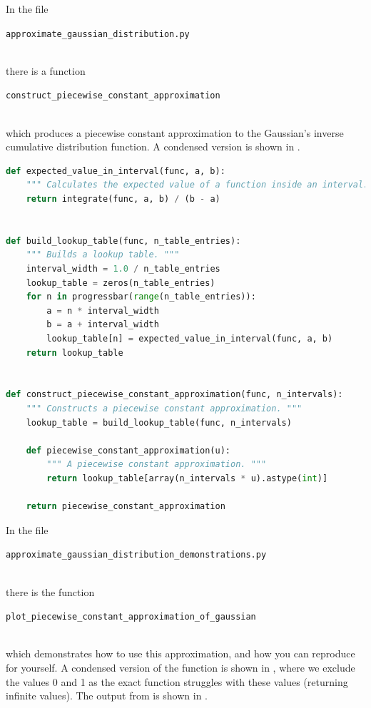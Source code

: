 \documentclass[11pt,a4paper,twoside,english]{extarticle}
\newcommand{\singlecodeline}[1]{\\[1em]\centerline{\lstinline[basicstyle=\ttfamily]$#1$}\\[1em]}
\begin{document}
In the file \singlecodeline{approximate_gaussian_distribution.py} there is a function \singlecodeline{construct_piecewise_constant_approximation} which produces a piecewise constant approximation to the Gaussian's inverse cumulative distribution function. A condensed version is shown in .

\begin{lstfloat}[htb]
\begin{lstlisting}[language=python, captionpos=b, caption={Constructing a piecewise constant approximation.}, label={code:python:construct_piecewise_constant_approximation}]
def expected_value_in_interval(func, a, b):
    """ Calculates the expected value of a function inside an interval. """
    return integrate(func, a, b) / (b - a)


def build_lookup_table(func, n_table_entries):
    """ Builds a lookup table. """
    interval_width = 1.0 / n_table_entries
    lookup_table = zeros(n_table_entries)
    for n in progressbar(range(n_table_entries)):
        a = n * interval_width
        b = a + interval_width
        lookup_table[n] = expected_value_in_interval(func, a, b)
    return lookup_table


def construct_piecewise_constant_approximation(func, n_intervals):
    """ Constructs a piecewise constant approximation. """
    lookup_table = build_lookup_table(func, n_intervals)

    def piecewise_constant_approximation(u):
        """ A piecewise constant approximation. """
        return lookup_table[array(n_intervals * u).astype(int)]

    return piecewise_constant_approximation
\end{lstlisting}
\end{lstfloat}

In the file \singlecodeline{approximate_gaussian_distribution_demonstrations.py}
there is the function  
\singlecodeline{plot_piecewise_constant_approximation_of_gaussian}
which demonstrates how to use this approximation, and how you can reproduce  for yourself. A condensed version of the function is shown in , where we exclude the values 0 and 1 as the exact function struggles with these values (returning infinite values). The output from  is shown in .
\end{document}

